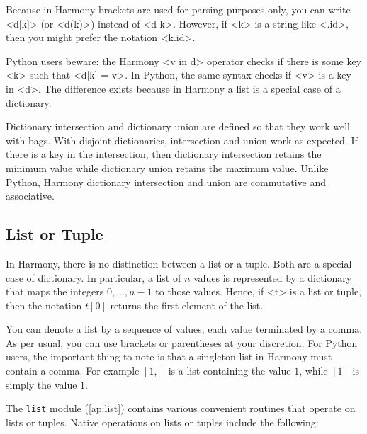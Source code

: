 \documentclass{report}
\begin{document}
Because in Harmony brackets are used for parsing purposes only,
you can write <{d[k]}> (or <{d(k)}>) instead of <{d k}>.
However, if <{k}> is a string like <{.id}>, then you might
prefer the notation <{k.id}>.

Python users beware: the Harmony <{v in d}> operator checks
if there is some key <{k}> such that <{d[k] = v}>.  In Python, the same
syntax checks if <{v}> is a key in <{d}>.  The difference exists because
in Harmony a list is a special case of a dictionary.

Dictionary intersection and dictionary union are defined so that
they work well with bags.  With disjoint dictionaries, intersection
and union work as expected.  If there is a key in the intersection, then
dictionary intersection retains the minimum value while dictionary
union retains the maximum value.  Unlike Python, Harmony
dictionary intersection and union are commutative and associative.

\subsection*{List or Tuple}

In Harmony, there is no distinction between a list or a tuple.
Both are a special case of dictionary.  In particular, a list of
$n$ values is represented by a dictionary that maps the integers
$0, ..., n-1$ to those values.  Hence, if <{t}> is a list or tuple,
then the notation $t[0]$ returns the first element of the list.

You can denote a list by a sequence of values, each value terminated
by a comma.  As per usual, you can use brackets or parentheses
at your discretion.  For Python users, the important thing to note
is that a singleton list in Harmony must contain a comma.  For
example $[1,]$ is a list containing the value $1$, while $[1]$
is simply the value $1$.

The \texttt{list} module (\autoref{ap:list}) contains various
convenient routines that operate on lists or tuples.
Native operations on lists or tuples include the following:
\end{document}
